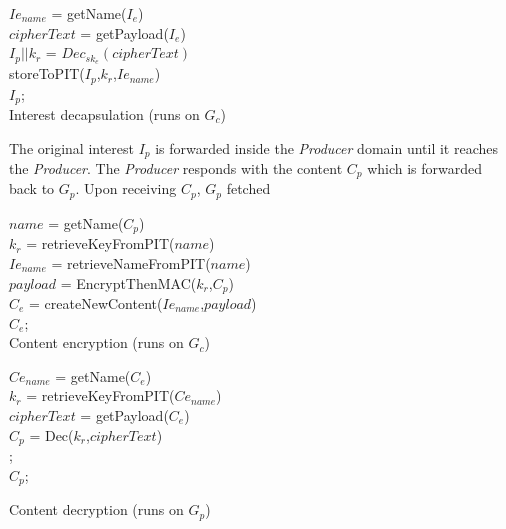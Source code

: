 \documentclass[conference,letterpaper,10pt]{IEEEtran}
\begin{document}
\begin{algorithm}[]\label{alg:interestDecap}
$Ie_{name}$ = getName($I_e$)\\
$cipherText$ = getPayload($I_e$)\\
$I_p||k_r$ = $Dec_{sk_e}(cipherText)$\\
storeToPIT($I_p$,$k_r$,$Ie_{name}$)\\
\Return $I_p$;\\
\caption{Interest decapsulation (runs on $G_c$)}
\end{algorithm}

The original interest $I_p$ is forwarded inside the \textit{Producer} domain until it reaches the \textit{Producer}. The \textit{Producer} responds with the content $C_p$ which is forwarded back to $G_p$.
Upon receiving $C_p$, $G_p$ fetched 

\begin{algorithm}[]\label{alg:contentEnc}
$name$ = getName($C_p$)\\
$k_r$ = retrieveKeyFromPIT($name$)\\
$Ie_{name}$ = retrieveNameFromPIT($name$)\\
$payload$ = EncryptThenMAC($k_r$,$C_p$)\\
$C_e$ = createNewContent($Ie_{name}$,$payload$)\\
\Return $C_e$;\\
\caption{Content encryption  (runs on $G_c$)}
\end{algorithm}


\begin{algorithm}[]\label{alg:contentDec}
$Ce_{name}$ = getName($C_e$)\\
$k_r$ = retrieveKeyFromPIT($Ce_{name}$)\\
$cipherText$ = getPayload($C_e$)\\
$C_p$ = Dec($k_r$,$cipherText$)\\
    {
    \Return ;\\
    }
    {\Return $C_p$;\\}
\caption{Content decryption (runs on $G_p$)}
\end{algorithm}
\end{document}
